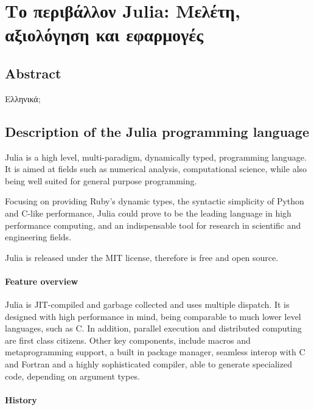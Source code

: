 \documentclass[]{article}
\date{}
\let\oldparagraph\paragraph
\renewcommand{\paragraph}[1]{\oldparagraph{#1}\mbox{}}
\begin{document}
\section{Το περιβάλλον Julia: Μελέτη, αξιολόγηση και
εφαρμογές}\label{ux3c4ux3bf-ux3c0ux3b5ux3c1ux3b9ux3b2ux3acux3bbux3bbux3bfux3bd-julia-ux3bcux3b5ux3bbux3adux3c4ux3b7-ux3b1ux3beux3b9ux3bfux3bbux3ccux3b3ux3b7ux3c3ux3b7-ux3baux3b1ux3b9-ux3b5ux3c6ux3b1ux3c1ux3bcux3bfux3b3ux3adux3c2}

\subsection{Abstract}\label{abstract}

Ελληνικά;

\subsection{Description of the Julia programming
language}\label{description-of-the-julia-programming-language}

Julia is a high level, multi-paradigm, dynamically typed, programming
language. It is aimed at fields such as numerical analysis,
computational science, while also being well suited for general purpose
programming.

Focusing on providing Ruby's dynamic types, the syntactic simplicity of
Python and C-like performance, Julia could prove to be the leading
language in high performance computing, and an indispensable tool for
research in scientific and engineering fields.

Julia is released under the MIT license, therefore is free and open
source.

\paragraph{Feature overview}\label{feature-overview}

Julia is JIT-compiled and garbage collected and uses multiple dispatch.
It is designed with high performance in mind, being comparable to much
lower level languages, such as C. In addition, parallel execution and
distributed computing are first class citizens. Other key components,
include macros and metaprogramming support, a built in package manager,
seamless interop with C and Fortran and a highly sophisticated compiler,
able to generate specialized code, depending on argument types.

\paragraph{History}\label{history}
\end{document}
